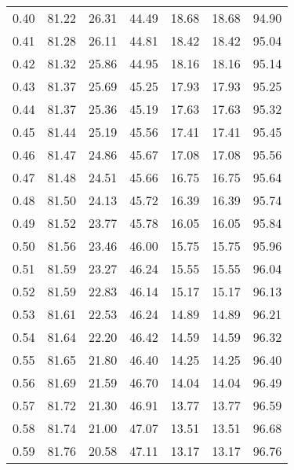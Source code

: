 \begin{tabular}{|c|c|c|c|c|c|c|}
      0.40 &     81.22 &     26.31 &      44.49 &   18.68 &      18.68 &         94.90 \\
      0.41 &     81.28 &     26.11 &      44.81 &   18.42 &      18.42 &         95.04 \\
      0.42 &     81.32 &     25.86 &      44.95 &   18.16 &      18.16 &         95.14 \\
      0.43 &     81.37 &     25.69 &      45.25 &   17.93 &      17.93 &         95.25 \\
      0.44 &     81.37 &     25.36 &      45.19 &   17.63 &      17.63 &         95.32 \\
      0.45 &     81.44 &     25.19 &      45.56 &   17.41 &      17.41 &         95.45 \\
      0.46 &     81.47 &     24.86 &      45.67 &   17.08 &      17.08 &         95.56 \\
      0.47 &     81.48 &     24.51 &      45.66 &   16.75 &      16.75 &         95.64 \\
      0.48 &     81.50 &     24.13 &      45.72 &   16.39 &      16.39 &         95.74 \\
      0.49 &     81.52 &     23.77 &      45.78 &   16.05 &      16.05 &         95.84 \\
      0.50 &     81.56 &     23.46 &      46.00 &   15.75 &      15.75 &         95.96 \\
      0.51 &     81.59 &     23.27 &      46.24 &   15.55 &      15.55 &         96.04 \\
      0.52 &     81.59 &     22.83 &      46.14 &   15.17 &      15.17 &         96.13 \\
      0.53 &     81.61 &     22.53 &      46.24 &   14.89 &      14.89 &         96.21 \\
      0.54 &     81.64 &     22.20 &      46.42 &   14.59 &      14.59 &         96.32 \\
      0.55 &     81.65 &     21.80 &      46.40 &   14.25 &      14.25 &         96.40 \\
      0.56 &     81.69 &     21.59 &      46.70 &   14.04 &      14.04 &         96.49 \\
      0.57 &     81.72 &     21.30 &      46.91 &   13.77 &      13.77 &         96.59 \\
      0.58 &     81.74 &     21.00 &      47.07 &   13.51 &      13.51 &         96.68 \\
      0.59 &     81.76 &     20.58 &      47.11 &   13.17 &      13.17 &         96.76 \\

\end{tabular}
